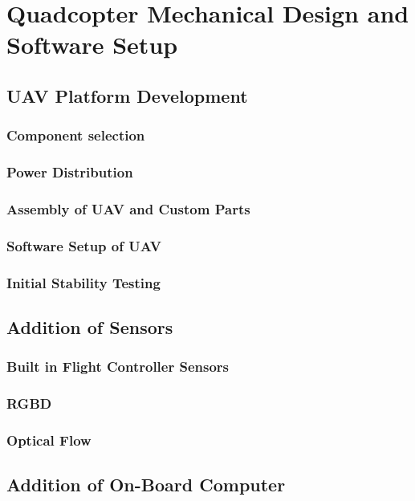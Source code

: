 \graphicspath{{introduction/fig/}}

\chapter{Quadcopter Mechanical Design and Software Setup}
\label{chap:Quadcopter Mechanical Design and Software Setupduction}

\section{UAV Platform Development}

\subsection{Component selection}
\subsection{ Power Distribution}
\subsection{Assembly of UAV and Custom Parts}
\subsection{Software Setup of UAV}
\subsection{Initial Stability Testing}

\section{Addition of Sensors}
\subsection{Built in Flight Controller Sensors}
\subsection{RGBD}
\subsection{Optical Flow}

\section{Addition of On-Board Computer}

